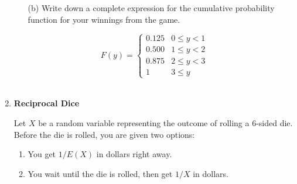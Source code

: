 \documentclass[12pt,a4paper]{article}
\numberwithin{equation}{subsection}
\begin{document}
\begin{enumerate}
\begin{enumerate}
    \item[(b)]Write down a complete expression for the cumulative probability function for your winnings from the game.
\end{enumerate}
\begin{equation*}
    \textit{F}(\textit{y}) =
    \begin{cases}
    0.125 & 0 \le y < 1 \\
    0.500 & 1 \le y < 2 \\
    0.875 & 2 \le y < 3 \\
    1 & 3 \le y
    \end{cases}
\end{equation*} \\

\item \textbf{Reciprocal Dice}

Let $X$ be a random variable representing the outcome of rolling a 6-sided die.  Before the die is rolled, you are given two options:

\begin{enumerate}
\item You get $1/E(X)$ in dollars right away.
\item You wait until the die is rolled, then get $1/X$ in dollars.
\end{enumerate}


\end{enumerate}
\end{document}
